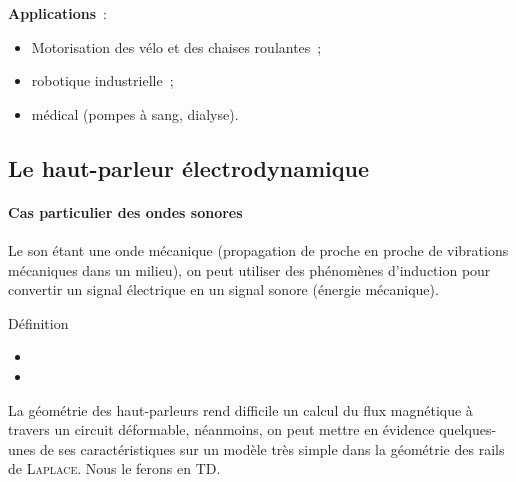 \documentclass[../main/main.tex]{subfiles}
\begin{document}
\textbf{Applications}~:
\begin{itemize}
	\item Motorisation des vélo et des chaises roulantes~;
	\item robotique industrielle~;
	\item médical (pompes à sang, dialyse).
\end{itemize}

\subsection{Le haut-parleur électrodynamique}
\label{ssec:hpelectro}

\paragraph*{Cas particulier des ondes sonores} Le son étant une onde mécanique
(propagation de proche en proche de vibrations mécaniques dans un milieu), on
peut utiliser des phénomènes d'induction pour convertir un signal électrique en
un signal sonore (énergie mécanique).

\begin{tdefi}{Définition}
	\begin{itemize}[label=$\diamond$, leftmargin=10pt]
		\item {}
		\item {}
		      \vspace{-10pt}
	\end{itemize}
\end{tdefi}

La géométrie des haut-parleurs rend difficile un calcul du flux magnétique à
travers un circuit déformable, néanmoins, on peut mettre en évidence
quelques-unes de ses caractéristiques sur un modèle très simple dans la
géométrie des rails de \textsc{Laplace}. Nous le ferons en TD.
\end{document}

